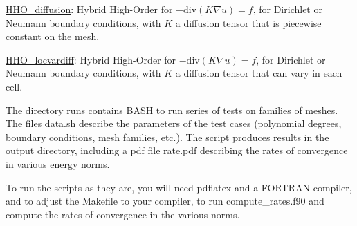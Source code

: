 \begin{DoxyItemize}
\item \hyperlink{classHArDCore2D_1_1HHO__Diffusion}{H\+H\+O\+\_\+diffusion}\+: Hybrid High-\/\+Order for $-\mathrm{div}(K\nabla u)=f$, for Dirichlet or Neumann boundary conditions, with $K$ a diffusion tensor that is piecewise constant on the mesh.
\item \hyperlink{classHArDCore2D_1_1HHO__LocVarDiff}{H\+H\+O\+\_\+locvardiff}\+: Hybrid High-\/\+Order for $-\mathrm{div}(K\nabla u)=f$, for Dirichlet or Neumann boundary conditions, with $K$ a diffusion tensor that can vary in each cell.
\end{DoxyItemize}

The directory {\ttfamily runs} contains B\+A\+SH to run series of tests on families of meshes. The files {\ttfamily data.\+sh} describe the parameters of the test cases (polynomial degrees, boundary conditions, mesh families, etc.). The script produces results in the {\ttfamily output} directory, including a pdf file {\ttfamily rate.\+pdf} describing the rates of convergence in various energy norms.

To run the scripts as they are, you will need {\ttfamily pdflatex} and a F\+O\+R\+T\+R\+AN compiler, and to adjust the {\ttfamily Makefile} to your compiler, to run {\ttfamily compute\+\_\+rates.\+f90} and compute the rates of convergence in the various norms. 